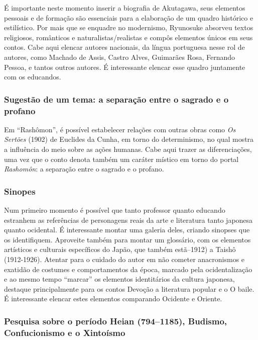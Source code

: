 \documentclass[12pt]{extarticle}
\begin{document}
É importante neste momento inserir a biografia de Akutagawa, seus elementos
pessoais e de formação são essenciais para a elaboração de um quadro histórico
e estilístico. Por mais que se enquadre no modernismo, Ryunosuke absorveu
textos religiosos, românticos e naturalistas/realistas e compôs elementos
únicos em seus contos. Cabe aqui elencar autores nacionais, da língua
portuguesa nesse rol de autores, como Machado de Assis, Castro Alves, Guimarães
Rosa, Fernando Pessoa, e tantos outros autores. É interessante elencar esse
quadro juntamente com os educandos.


\subsubsection{Sugestão de um tema: a separação entre o sagrado e o profano}

Em ``Rashômon'', é possível estabelecer relações com outras obras como \textit{Os Sertões}
(1902) de Euclides da Cunha, em torno do determinismo, no qual mostra a
influência do meio sobre as ações humanas. Cabe aqui trazer as diferenciações,
uma vez que o conto denota também um caráter místico em torno do portal
\emph{Rashomôn}: a separação entre o sagrado e o profano.

\subsubsection{Sinopes}

Num primeiro momento é possível que tanto professor quanto educando estranhem
as referências de personagens reais da arte e literatura tanto japonesa quanto
ocidental. É interessante montar uma galeria deles, criando sinopses que os
identifiquem. Aproveite também para montar um glossário, com os elementos
artísticos e culturais específicos do Japão, que também estã--1912) a Taishô
(1912-1926). Atentar para o cuidado do autor em não cometer anacronismos e
exatidão de costumes e comportamentos da época, marcado pela ocidentalização e
ao mesmo tempo ``marcar'' os elementos identitários da cultura japonesa,
destaque principalmente para os contos Devoção a literatura popular e o O
baile. É interessante elencar estes elementos comparando Ocidente e Oriente.

\subsubsection{Pesquisa sobre o período Heian (794--1185), Budismo, Confucionismo e o
Xintoísmo}
\end{document}

